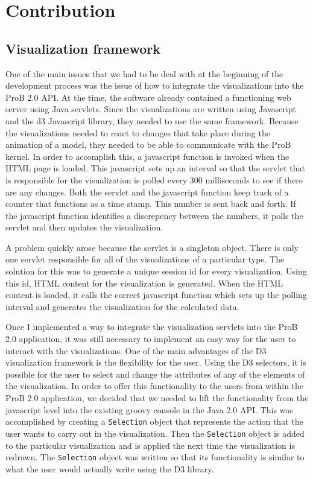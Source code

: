 \section{Contribution}

\subsection{Visualization framework}

One of the main issues that we had to be deal with at the beginning of the development process was the issue of how to integrate the visualizations into the ProB 2.0 API. At the time, the software already contained a functioning web server using Java servlets. Since the visualizations are written using Javascript and the d3 Javascript library, they needed to use the same framework. Because the visualizations needed to react to changes that take place during the animation of a model, they needed to be able to communicate with the ProB kernel. In order to accomplish this, a javascript function is invoked when the HTML page is loaded. This javascript sets up an interval so that the servlet that is responsible for the visualization is polled every 300 milliseconds to see if there are any changes. Both the servlet and the javascript function keep track of a counter that functions as a time stamp. This number is sent back and forth. If the javascript function identifies a discrepency between the numbers, it polls the servlet and then updates the visualization.

A problem quickly arose because the servlet is a singleton object. There is only one servlet responsible for all of the visualizations of a particular type. The solution for this was to generate a unique session id for every visualization. Using this id, HTML content for the visualization is generated. When the HTML content is loaded, it calls the correct javascript function which sets up the polling interval and generates the visualization for the calculated data.

Once I implemented a way to integrate the visualization servlets into the ProB 2.0 application, it was still necessary to implement an easy way for the user to interact with the visualizations. One of the main advantages of the D3 visualization framework is the flexibility for the user. Using the D3 selectors, it is possible for the user to select and change the attributes of any of the elements of the visualization. In order to offer this functionality to the users from within the ProB 2.0 application, we decided that we needed to lift the functionality from the javascript level into the existing groovy console in the Java 2.0 API. This was accomplished by creating a \texttt{Selection} object that represents the action that the user wants to carry out in the visualization. Then the \texttt{Selection} object is added to the particular visualization and is applied the next time the visualization is redrawn. The \texttt{Selection} object was written so that its functionality is similar to what the user would actually write using the D3 library.

